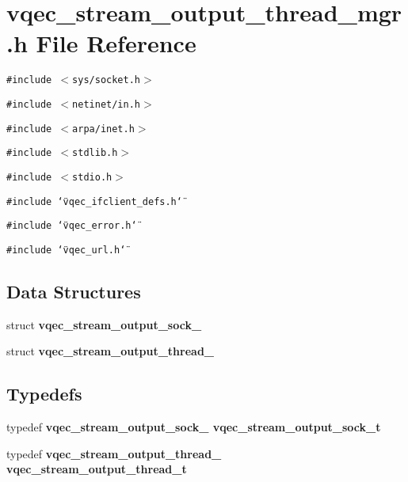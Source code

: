 \section{vqec\_\-stream\_\-output\_\-thread\_\-mgr.h File Reference}
\label{vqec__stream__output__thread__mgr_8h}
{\tt \#include $<$sys/socket.h$>$}\par
{\tt \#include $<$netinet/in.h$>$}\par
{\tt \#include $<$arpa/inet.h$>$}\par
{\tt \#include $<$stdlib.h$>$}\par
{\tt \#include $<$stdio.h$>$}\par
{\tt \#include \char`\"{}vqec\_\-ifclient\_\-defs.h\char`\"{}}\par
{\tt \#include \char`\"{}vqec\_\-error.h\char`\"{}}\par
{\tt \#include \char`\"{}vqec\_\-url.h\char`\"{}}\par
\subsection*{Data Structures}
\begin{CompactItemize}
\item 
struct \bf{vqec\_\-stream\_\-output\_\-sock\_\-}
\item 
struct \bf{vqec\_\-stream\_\-output\_\-thread\_\-}
\end{CompactItemize}
\subsection*{Typedefs}
\begin{CompactItemize}
\item 
typedef \bf{vqec\_\-stream\_\-output\_\-sock\_\-} \bf{vqec\_\-stream\_\-output\_\-sock\_\-t}
\item 
typedef \bf{vqec\_\-stream\_\-output\_\-thread\_\-} \bf{vqec\_\-stream\_\-output\_\-thread\_\-t}
\end{CompactItemize}

